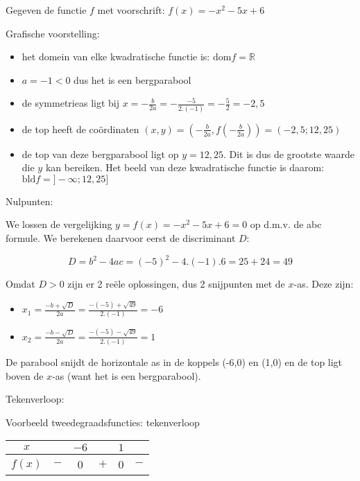 \begin{voorbeeld}
	Gegeven de functie $f$ met voorschrift: $f(x)=-x^{2}-5x+6$ 

Grafische voorstelling:
\begin{itemize}
\item het domein van elke kwadratische functie is: $\textrm{dom}f=\mathbb{R}$
\item $a=-1<0$ dus het is een bergparabool
\item de symmetrieas ligt bij $x=-\frac{b}{2a}=-\frac{-5}{2.(-1)}=-\frac{5}{2}=-2,5$
\item de top heeft de co\"ordinaten $(x,y)=(-\frac{b}{2a},f(-\frac{b}{2a}))=(-2,5;12,25)$
\item de top van deze bergparabool ligt op $y=12,25$. Dit is dus de grootste
waarde die $y$ kan bereiken. Het beeld van deze kwadratische functie
is daarom: $\textrm{bld}f=]-\infty;12,25]$
\end{itemize}


Nulpunten:

We lossen de vergelijking $y=f(x)=-x^{2}-5x+6=0$ op d.m.v.
de abc formule. We berekenen daarvoor eerst de discriminant $D$:

\begin{equation*}
D=b^{2}-4ac=(-5)^{2}-4.(-1).6=25+24=49
\end{equation*}

Omdat $D>0$ zijn er 2 re\"ele oplossingen, dus 2 snijpunten
met de $x$-as. Deze zijn:
\begin{itemize}
\item $x_{1}=\frac{-b+\sqrt{D}}{2a}=\frac{-(-5)+\sqrt{49}}{2.(-1)}=-6$
\item $x_{2}=\frac{-b-\sqrt{D}}{2a}=\frac{-(-5)-\sqrt{49}}{2.(-1)}=1$
\end{itemize}
De parabool snijdt de horizontale as in de koppels (-6,0) en (1,0)
en de top ligt boven de $x$-as (want het is een bergparabool).



Tekenverloop:


\begin{tabel}{Voorbeeld tweedegraadsfuncties: tekenverloop}
\begin{tabular}{c||c|c|c|c|c}
	$x$ &  & $-6$ &  & $1$ & \\
	\hline 
	$f(x)$ & $-$ & 0 & $+$ & 0 & $-$\\
\end{tabular}
\label{tab:tweede:vb}	
\end{tabel}

\end{voorbeeld}